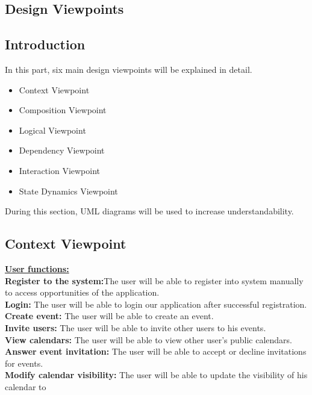 \newpage

\begin{center}
\section{Design Viewpoints}
\end{center}

\subsection{Introduction}
\qquad In this part, six main design viewpoints will be explained in detail.
\begin{itemize}
  \item Context Viewpoint
  \item Composition Viewpoint
  \item Logical Viewpoint
  \item Dependency Viewpoint
  \item Interaction Viewpoint
  \item State Dynamics Viewpoint
\end{itemize}
\qquad During this section, UML diagrams will be used to increase understandability. 

\subsection{Context Viewpoint}
\underline{\textbf{User functions:}}\\
\textbf{Register to the system:}The user will be able to register into system manually to access opportunities of the application.\\
\textbf{Login:} The user will be able to login our application after successful registration.\\
\textbf{Create event:} The user will be able to create an event.\\
\textbf{Invite users:} The user will be able to invite other users to his events.\\

\textbf{View calendars:} The user will be able to view other user’s public calendars.\\

\textbf{Answer event invitation:} The user will be able to accept or decline invitations for events.\\

\textbf{Modify calendar visibility:} The user will be able to update the visibility of his calendar to

